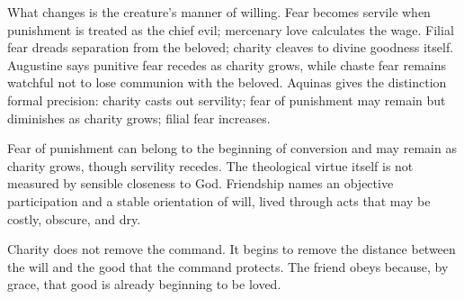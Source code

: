What changes is the creature's manner of willing. Fear becomes servile when punishment is treated as the chief evil; mercenary love calculates the wage. Filial fear dreads separation from the beloved; charity cleaves to divine goodness itself. Augustine says punitive fear recedes as charity grows, while chaste fear remains watchful not to lose communion with the beloved. Aquinas gives the distinction formal precision: charity casts out servility; fear of punishment may remain but diminishes as charity grows; filial fear increases.

Fear of punishment can belong to the beginning of conversion and may remain as charity grows, though servility recedes. The theological virtue itself is not measured by sensible closeness to God. Friendship names an objective participation and a stable orientation of will, lived through acts that may be costly, obscure, and dry.

Charity does not remove the command. It begins to remove the distance between the will and the good that the command protects. The friend obeys because, by grace, that good is already beginning to be loved.
